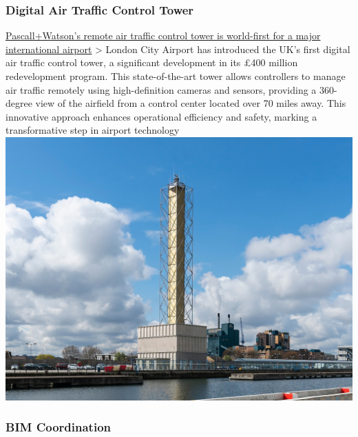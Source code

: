 \documentclass[
]{article}
\begin{document}
\subsubsection{Digital Air Traffic Control
Tower}\label{digital-air-traffic-control-tower}

\href{https://www.pascalls.co.uk/news/article/pascallwatsons-remote-air-traffic-control-tower-is-world-first-for-a-major-international-airport/}{Pascall+Watson's
remote air traffic control tower is world-first for a major
international airport} \textgreater{} London City Airport has introduced
the UK's first digital air traffic control tower, a significant
development in its £400 million redevelopment program. This
state-of-the-art tower allows controllers to manage air traffic remotely
using high-definition cameras and sensors, providing a 360-degree view
of the airfield from a control center located over 70 miles away. This
innovative approach enhances operational efficiency and safety, marking
a transformative step in airport technology
\includegraphics{assets/PAW/LCY2-News-4-3.jpg}

\subsubsection{BIM Coordination}\label{bim-coordination}
\end{document}

